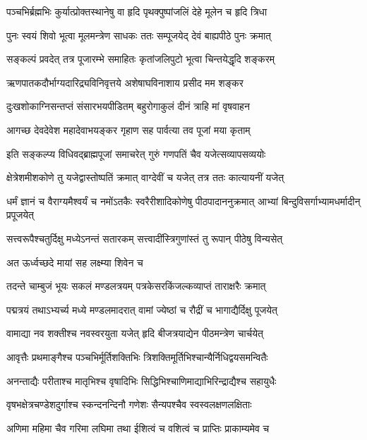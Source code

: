\begin{center}
\twolineshloka
{पञ्चभिर्ब्रह्मभिः कुर्यात्प्रोक्तस्थानेषु वा हृदि}
{पृथक्पुष्पांजलिं देहे मूलेन च हृदि त्रिधा} %

\twolineshloka
{पुनः स्वयं शिवो भूत्वा मूलमन्त्रेण साधकः}
{ततः सम्पूजयेद् देवं बाह्यपीठे पुनः क्रमात्} %

\twolineshloka
{सङ्कल्पं प्रवदेत् तत्र पूजारम्भे समाहितः}
{कृतांजलिपुटो भूत्वा चिन्तयेद्धृदि शङ्करम्} %

\twolineshloka
{ऋणपातकदौर्भाग्यदारिद्र्यविनिवृत्तये}
{अशेषाघविनाशाय प्रसीद मम शङ्कर} %

\twolineshloka
{दुःखशोकाग्निसन्तप्तं संसारभयपीडितम्}
{बहुरोगाकुलं दीनं त्राहि मां वृषवाहन} %

\twolineshloka
{आगच्छ देवदेवेश महादेवाभयङ्कर}
{गृहाण सह पार्वत्या तव पूजां मया कृताम्} %

\twolineshloka
{इति सङ्कल्प्य विधिवद्ब्राह्मपूजां समाचरेत्}
{गुरुं गणपतिं चैव यजेत्सव्यापसव्ययोः} %

\twolineshloka
{क्षेत्रेशमीशकोणे तु यजेद्वास्तोष्पतिं क्रमात्}
{वाग्देवीं च यजेत् तत्र ततः कात्यायनीं यजेत्} %

\threelineshloka
{धर्मं ज्ञानं च वैराग्यमैश्वर्यं च नमोंऽतकैः}
{स्वरैरीशादिकोणेषु पीठपादाननुक्रमात्}
{आभ्यां बिन्दुविसर्गाभ्यामधर्मादीन् प्रपूजयेत्} %

\twolineshloka
{सत्त्वरूपैश्चतुर्दिक्षु मध्येऽनन्तं सतारकम्}
{सत्त्वादींस्त्रिगुणांस्तं तु रूपान् पीठेषु विन्यसेत्} %

\onelineshloka
{अत ऊर्ध्वच्छदे मायां सह लक्ष्म्या शिवेन च} %

\twolineshloka
{तदन्ते चाम्बुजं भूयः सकलं मण्डलत्रयम्}
{पत्रकेसरकिंजल्कव्याप्तं ताराक्षरैः क्रमात्} %

\twolineshloka
{पद्मत्रयं तथाऽभ्यर्च्य मध्ये मण्डलमादरात्}
{वामां ज्येष्ठां च रौद्रीं च भागाद्यैर्दिक्षु पूजयेत्} %

\twolineshloka
{वामाद्या नव शक्तीश्च नवस्वरयुता यजेत्}
{हृदि बीजत्रयाद्येन पीठमन्त्रेण चार्चयेत्} %

\twolineshloka
{आवृत्तैः प्रथमाङ्गैश्च पञ्चभिर्मूर्तिशक्तिभिः}
{त्रिशक्तिमूर्तिभिश्चान्यैर्निधिद्वयसमन्वितैः} %

\twolineshloka
{अनन्ताद्यैः परीताश्च मातृभिश्च वृषादिभिः}
{सिद्धिभिश्चाणिमाद्याभिरिन्द्राद्यैश्च सहायुधैः} %

\twolineshloka
{वृषभक्षेत्रचण्डेशदुर्गाश्च स्कन्दनन्दिनौ}
{गणेशः सैन्यपश्चैव स्वस्वलक्षणलक्षिताः} %

\twolineshloka
{अणिमा महिमा चैव गरिमा लघिमा तथा}
{ईशित्वं च वशित्वं च प्राप्तिः प्राकाम्यमेव च} %


\end{center}
